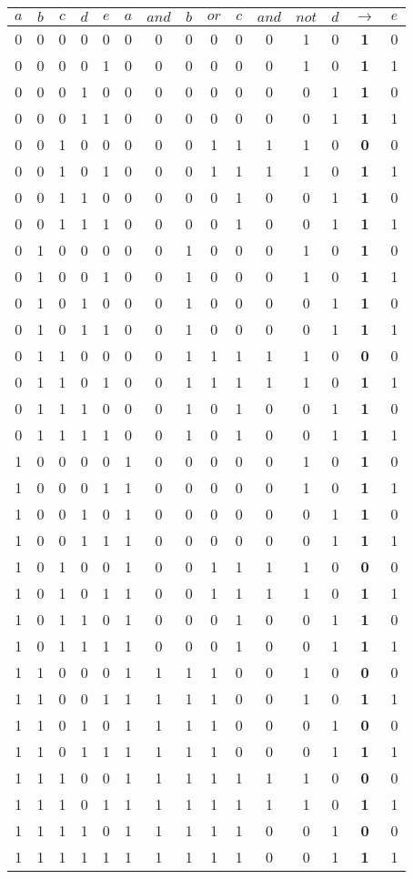 \documentclass[11pt, landscape]{article}
\begin{document}
\begin{tabular}{|c|c|c|c|c|cccccccccc|} \hline
$a$&$b$&$c$&$d$&$e$&$a$&$and$&$b$&$or$&$c$&$and$&$not$&$d$&$\rightarrow$&$e$\\\hline
0&0&0&0&0&0&0&0&0&0&0&1&0&\textbf{1}&0\\\hline
0&0&0&0&1&0&0&0&0&0&0&1&0&\textbf{1}&1\\\hline
0&0&0&1&0&0&0&0&0&0&0&0&1&\textbf{1}&0\\\hline
0&0&0&1&1&0&0&0&0&0&0&0&1&\textbf{1}&1\\\hline
0&0&1&0&0&0&0&0&1&1&1&1&0&\textbf{0}&0\\\hline
0&0&1&0&1&0&0&0&1&1&1&1&0&\textbf{1}&1\\\hline
0&0&1&1&0&0&0&0&0&1&0&0&1&\textbf{1}&0\\\hline
0&0&1&1&1&0&0&0&0&1&0&0&1&\textbf{1}&1\\\hline
0&1&0&0&0&0&0&1&0&0&0&1&0&\textbf{1}&0\\\hline
0&1&0&0&1&0&0&1&0&0&0&1&0&\textbf{1}&1\\\hline
0&1&0&1&0&0&0&1&0&0&0&0&1&\textbf{1}&0\\\hline
0&1&0&1&1&0&0&1&0&0&0&0&1&\textbf{1}&1\\\hline
0&1&1&0&0&0&0&1&1&1&1&1&0&\textbf{0}&0\\\hline
0&1&1&0&1&0&0&1&1&1&1&1&0&\textbf{1}&1\\\hline
0&1&1&1&0&0&0&1&0&1&0&0&1&\textbf{1}&0\\\hline
0&1&1&1&1&0&0&1&0&1&0&0&1&\textbf{1}&1\\\hline
1&0&0&0&0&1&0&0&0&0&0&1&0&\textbf{1}&0\\\hline
1&0&0&0&1&1&0&0&0&0&0&1&0&\textbf{1}&1\\\hline
1&0&0&1&0&1&0&0&0&0&0&0&1&\textbf{1}&0\\\hline
1&0&0&1&1&1&0&0&0&0&0&0&1&\textbf{1}&1\\\hline
1&0&1&0&0&1&0&0&1&1&1&1&0&\textbf{0}&0\\\hline
1&0&1&0&1&1&0&0&1&1&1&1&0&\textbf{1}&1\\\hline
1&0&1&1&0&1&0&0&0&1&0&0&1&\textbf{1}&0\\\hline
1&0&1&1&1&1&0&0&0&1&0&0&1&\textbf{1}&1\\\hline
1&1&0&0&0&1&1&1&1&0&0&1&0&\textbf{0}&0\\\hline
1&1&0&0&1&1&1&1&1&0&0&1&0&\textbf{1}&1\\\hline
1&1&0&1&0&1&1&1&1&0&0&0&1&\textbf{0}&0\\\hline
1&1&0&1&1&1&1&1&1&0&0&0&1&\textbf{1}&1\\\hline
1&1&1&0&0&1&1&1&1&1&1&1&0&\textbf{0}&0\\\hline
1&1&1&0&1&1&1&1&1&1&1&1&0&\textbf{1}&1\\\hline
1&1&1&1&0&1&1&1&1&1&0&0&1&\textbf{0}&0\\\hline
1&1&1&1&1&1&1&1&1&1&0&0&1&\textbf{1}&1\\\hline
\end{tabular}
\end{document}
